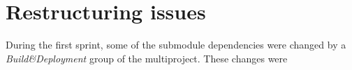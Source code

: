\section{Restructuring issues}
\label{sec:restructuring_issues}

During the first sprint, some of the submodule dependencies were changed by a \emph{Build\&Deployment} group of the multiproject. These changes were 
